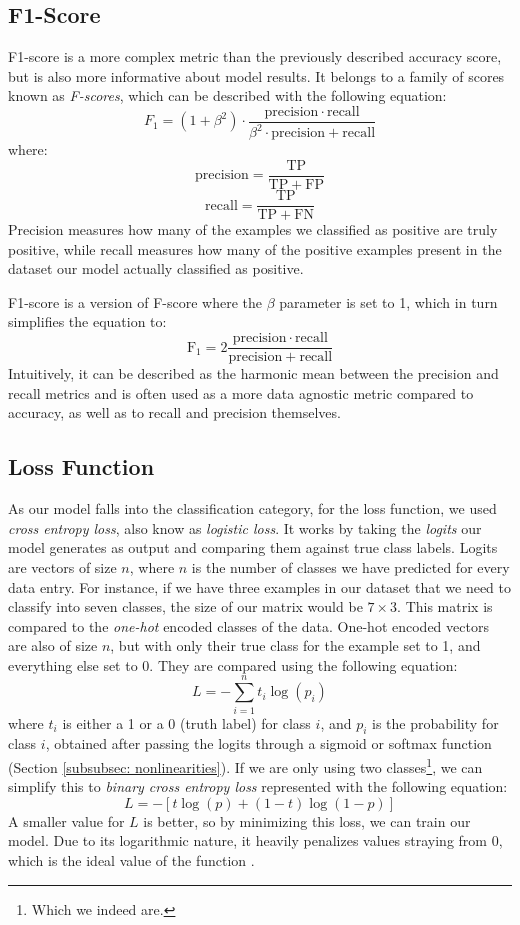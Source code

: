 \documentclass[times, utf8, diplomski, english]{fer_eng}
\begin{document}
\subsection{F1-Score}
\label{subsec:f1 score}

F1-score is a more complex metric than the previously described accuracy score, but is also more informative about model results. It belongs to a family of scores known as \textit{F-scores}, which can be described with the following equation:
\[ F_1 = (1 + \beta^2) \cdot \frac{\mathrm{precision} \cdot \mathrm{recall}}{\beta^2 \cdot \mathrm{precision} + \mathrm{recall}} \] where:
\[ \mathrm{precision} = \frac{\mathrm{TP}}{\mathrm{TP} + \mathrm{FP}} \]
\[ \mathrm{recall} = \frac{\mathrm{TP}}{\mathrm{TP} + \mathrm{FN}} \]
Precision measures how many of the examples we classified as positive are truly positive, while recall measures how many of the positive examples present in the dataset our model actually classified as positive.

F1-score is a version of F-score where the $\beta$ parameter is set to 1, which in turn simplifies the equation to:
\[ \mathrm{F_1} = 2 \frac{\mathrm{precision} \cdot \mathrm{recall}}{\mathrm{precision} + \mathrm{recall}} \]
Intuitively, it can be described as the harmonic mean between the precision and recall metrics and is often used as a more data agnostic metric compared to accuracy, as well as to recall and precision themselves.

\subsection{Loss Function}
\label{subsec:loss function}

As our model falls into the classification category, for the loss function, we used \textit{cross entropy loss}, also know as \textit{logistic loss}. It works by taking the \textit{logits} our model generates as output and comparing them against true class labels. Logits are vectors of size $n$, where $n$ is the number of classes we have predicted for every data entry. For instance, if we have three examples in our dataset that we need to classify into seven classes, the size of our matrix would be $7 \times 3$. This matrix is compared to the \textit{one-hot} encoded classes of the data. One-hot encoded vectors are also of size $n$, but with only their true class for the example set to 1, and everything else set to 0. They are compared using the following equation:
\[ L = - \sum_{i = 1}^n t_i \log (p_i) \]
where $t_i$ is either a 1 or a 0 (truth label) for class $i$, and $p_i$ is the probability for class $i$, obtained after passing the logits through a sigmoid or softmax function (Section \ref{subsubsec: nonlinearities}). If we are only using two classes\footnote{Which we indeed are.}, we can simplify this to \textit{binary cross entropy loss} represented with the following equation:
\[ L = - [t \log (p) + (1 - t) \log (1 - p)] \]
A smaller value for $L$ is better, so by minimizing this loss, we can train our model. Due to its logarithmic nature, it heavily penalizes values straying from 0, which is the ideal value of the function \cite{CEL}.
\end{document}

